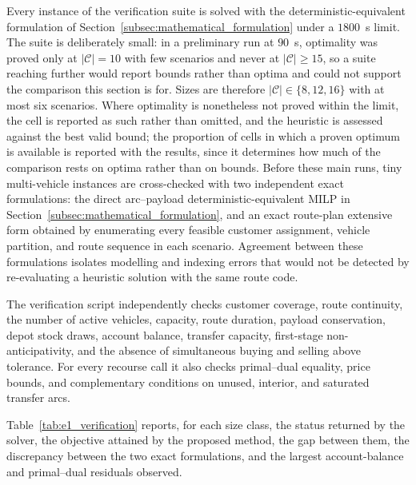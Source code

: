 \documentclass[authoryear,final,3p,times]{elsarticle}
\theoremstyle{definition}
\theoremstyle{plain}
\begin{document}
Every instance of the verification suite is solved with the deterministic-equivalent formulation of Section~\ref{subsec:mathematical_formulation} under a $1800$~s limit.  The suite is deliberately small: in a preliminary run at $90$~s, optimality was proved only at $|\mathcal C|=10$ with few scenarios and never at $|\mathcal C|\ge15$, so a suite reaching further would report bounds rather than optima and could not support the comparison this section is for.  Sizes are therefore $|\mathcal C|\in\{8,12,16\}$ with at most six scenarios.  Where optimality is nonetheless not proved within the limit, the cell is reported as such rather than omitted, and the heuristic is assessed against the best valid bound; the proportion of cells in which a proven optimum is available is reported with the results, since it determines how much of the comparison rests on optima rather than on bounds. Before these main runs, tiny multi-vehicle instances are cross-checked with two independent exact formulations: the direct arc--payload deterministic-equivalent MILP in Section~\ref{subsec:mathematical_formulation}, and an exact route-plan extensive form obtained by enumerating every feasible customer assignment, vehicle partition, and route sequence in each scenario.  Agreement between these formulations isolates modelling and indexing errors that would not be detected by re-evaluating a heuristic solution with the same route code.

The verification script independently checks customer coverage, route continuity, the number of active vehicles, capacity, route duration, payload conservation, depot stock draws, account balance, transfer capacity, first-stage non-anticipativity, and the absence of simultaneous buying and selling above tolerance. For every recourse call it also checks primal--dual equality, price bounds, and complementary conditions on unused, interior, and saturated transfer arcs.

Table~\ref{tab:e1_verification} reports, for each size class, the status
returned by the solver, the objective attained by the proposed method, the
gap between them, the discrepancy between the two exact formulations, and the
largest account-balance and primal--dual residuals observed.

\begin{table}[!htbp]
\centering
\caption{Exact and numerical verification on the verification suite.}
\label{tab:e1_verification}
\end{table}
\end{document}
